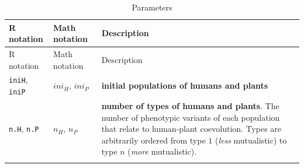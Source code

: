 \documentclass[
]{book}
\begin{document}
\begin{longtable}[]{@{}lll@{}}
\caption{Parameters}\tabularnewline
\toprule
\begin{minipage}[b]{0.27\columnwidth}\raggedright
R notation\strut
\end{minipage} & \begin{minipage}[b]{0.25\columnwidth}\raggedright
Math notation\strut
\end{minipage} & \begin{minipage}[b]{0.40\columnwidth}\raggedright
Description\strut
\end{minipage}\tabularnewline
\midrule
\endfirsthead
\toprule
\begin{minipage}[b]{0.27\columnwidth}\raggedright
R notation\strut
\end{minipage} & \begin{minipage}[b]{0.25\columnwidth}\raggedright
Math notation\strut
\end{minipage} & \begin{minipage}[b]{0.40\columnwidth}\raggedright
Description\strut
\end{minipage}\tabularnewline
\midrule
\endhead
\begin{minipage}[t]{0.27\columnwidth}\raggedright
\texttt{iniH}, \texttt{iniP}\strut
\end{minipage} & \begin{minipage}[t]{0.25\columnwidth}\raggedright
\(ini_{H},\,ini_{P}\)\strut
\end{minipage} & \begin{minipage}[t]{0.40\columnwidth}\raggedright
\textbf{initial populations of humans and plants}\strut
\end{minipage}\tabularnewline
\begin{minipage}[t]{0.27\columnwidth}\raggedright
\texttt{n.H}, \texttt{n.P}\strut
\end{minipage} & \begin{minipage}[t]{0.25\columnwidth}\raggedright
\(n_{H},\,n_{P}\)\strut
\end{minipage} & \begin{minipage}[t]{0.40\columnwidth}\raggedright
\textbf{number of types of humans and plants}. The number of phenotypic variants of each population that relate to human-plant coevolution. Types are arbitrarily ordered from type \(1\) (\emph{less} mutualistic) to type \(n\) (\emph{more} mutualistic).\strut
\end{minipage}\tabularnewline
\begin{minipage}[t]{0.27\columnwidth}\raggedright

\end{minipage}
\end{longtable}
\end{document}
